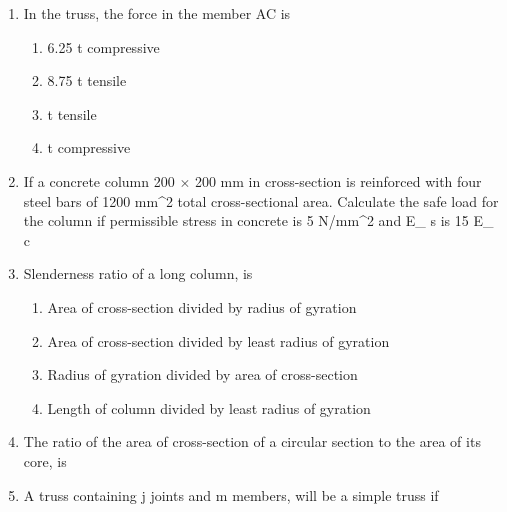 \documentclass[11pt,a4paper]{article}
\begin{document}
\begin{enumerate}
\begin{enumerate*}[itemjoin=\qquad, label=\Alph*.]
\item{3 mm}
\item{4 mm}
\item{5 mm }
\end{enumerate*}
\item{In the truss, the force in the member AC is}
\begin{enumerate}[label=\Alph*.]
\item{6.25 t compressive}
\item{8.75 t tensile}
\item{t tensile}
\item{t compressive}
\end{enumerate}
\item{If a concrete column 200 $\times$ 200 mm in cross-section is reinforced with four steel bars of 1200 mm\^{}2 total cross-sectional area. Calculate the safe load for the column if permissible stress in concrete is 5 N/mm\^{}2 and E\_ s is 15 E\_ c
}
\\
\item{Slenderness ratio of a long column, is}
\begin{enumerate}[label=\Alph*.]
\item{Area of cross-section divided by radius of gyration}
\item{Area of cross-section divided by least radius of gyration}
\item{Radius of gyration divided by area of cross-section}
\item{Length of column divided by least radius of gyration}
\end{enumerate}
\item{The ratio of the area of cross-section of a circular section to the area of its core, is}
\\
\item{A truss containing j joints and m members, will be a simple truss if}

\end{enumerate}
\end{document}
